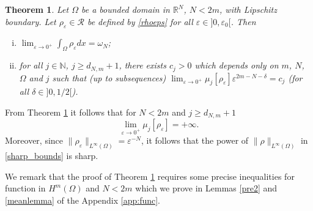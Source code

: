 \documentclass[11pt,a4paper]{amsart}
\numberwithin{equation}{section}
\newtheorem{thm}[equation]{Theorem}
\begin{document}
\begin{thm}\label{counter23}
Let $\Omega$ be a bounded domain in $\mathbb R^N$, $N<2m$, with Lipschitz boundary. Let $\rho_{\varepsilon}\in\mathcal R$ be defined by \eqref{rhoeps} for all $\varepsilon\in]0,\varepsilon_0[$. Then
\begin{enumerate}[i)]
\item $\lim_{\varepsilon\rightarrow 0^+}\int_{\Omega}\rho_{\varepsilon}dx=\omega_N$;
\item for all $j\in\mathbb N$, $j\geq d_{N,m}+1$, there exists $c_j>0$ which depends only on $m$, $N$, $\Omega$ and $j$ such that (up to subsequences) $\lim_{\varepsilon\rightarrow 0^+}\mu_j[\rho_{\varepsilon}]\varepsilon^{2m-N-\delta}= c_j$ (for all $\delta\in]0,1/2[$).
\end{enumerate}
\end{thm}

From Theorem \ref{counter23} it follows that for $N<2m$ and $j\geq d_{N,m}+1$
$$
\lim_{\varepsilon\rightarrow 0^+}\mu_j[\rho_{\varepsilon}]= +\infty.
$$
Moreover, since $\|\rho_{\varepsilon}\|_{L^{\infty}(\Omega)}=\varepsilon^{-N}$, it follows that the power of $\|\rho\|_{L^{\infty}(\Omega)}$ in \eqref{sharp_bounds} is sharp.

We remark that the proof of Theorem \ref{counter23} requires some precise inequalities for function in $H^m(\Omega)$ and $N<2m$ which we prove in Lemmas \ref{pre2} and \ref{meanlemma} of the Appendix \ref{app:func}.
\end{document}

